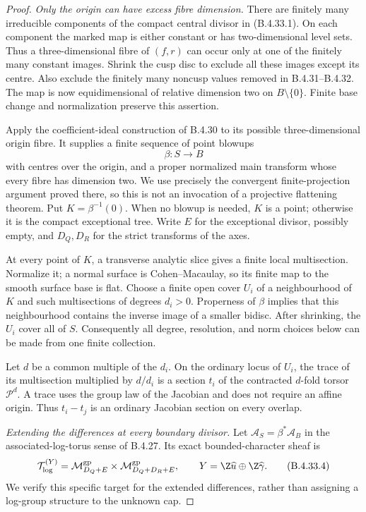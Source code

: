 \begin{proof}
\emph{Only the origin can have excess fibre dimension.}
There are finitely many irreducible components
of the compact central divisor in (B.4.33.1).
On each component the marked map is either
constant or has two-dimensional level sets.
Thus a three-dimensional fibre of $(f,r)$
can occur only at one of the finitely many
constant images. Shrink the cusp disc to
exclude all these images except its centre.
Also exclude the finitely many noncusp values
removed in B.4.31--B.4.32. The map is now
equidimensional of relative dimension two
on $B\setminus\{0\}$. Finite base change
and normalization preserve this assertion.

Apply the coefficient-ideal construction of
B.4.30 to its possible three-dimensional
origin fibre. It supplies a finite sequence
of point blowups
\[
 \beta:S\longrightarrow B
 \tag{B.4.33.3}
\]
with centres over the origin, and a proper
normalized main transform whose every fibre
has dimension two. We use precisely the
convergent finite-projection argument proved
there, so this is not an invocation of a
projective flattening theorem. Put
$K=\beta^{-1}(0)$. When no blowup is needed,
$K$ is a point; otherwise it is the compact
exceptional tree. Write $E$ for the exceptional
divisor, possibly empty, and $D_Q,D_R$ for
the strict transforms of the axes.

At every point of $K$, a transverse analytic
slice gives a finite local multisection.
Normalize it; a normal surface is
Cohen--Macaulay, so its finite map to the
smooth surface base is flat. Choose a finite
open cover $U_i$ of a neighbourhood of $K$
and such multisections of degrees $d_i>0$.
Properness of $\beta$ implies that this
neighbourhood contains the inverse image
of a smaller bidisc. After shrinking, the
$U_i$ cover all of $S$. Consequently all
degree, resolution, and norm choices below
can be made from one finite collection.

Let $d$ be a common multiple of the $d_i$.
On the ordinary locus of $U_i$, the trace
of its multisection multiplied by $d/d_i$
is a section $t_i$ of the contracted
$d$-fold torsor $\mathscr P^d$. A trace
uses the group law of the Jacobian and
does not require an affine origin. Thus
$t_i-t_j$ is an ordinary Jacobian section
on every overlap.

\emph{Extending the differences at every boundary divisor.}
Let $\mathcal A_S=\beta^*\mathcal A_B$ in
the associated-log-torus sense of B.4.27.
Its exact bounded-character sheaf is
\[
 \mathcal T_{\log}^{(Y)}
  =\mathcal M_{D_Q+E}^{\rm gp}
        \times\mathcal M_{D_Q+D_R+E}^{\rm gp},
 \qquad Y=\Z\widehat u\oplus\Z\widehat\gamma.
 \tag{B.4.33.4}
\]
We verify this specific target for the
extended differences, rather than assigning
a log-group structure to the unknown cap.


\end{proof}
